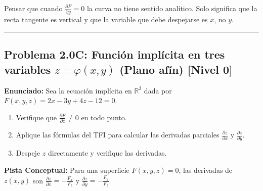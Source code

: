 \documentclass[11pt,a4paper]{article}
\begin{document}
\begin{trapbox}
Pensar que cuando $\frac{\partial F}{\partial y} = 0$ la curva no tiene sentido analítico. Solo significa que la recta tangente es vertical y que la variable que debe despejarse es $x$, no $y$.
\end{trapbox}

\vspace{0.5cm}
\hrule
\vspace{0.5cm}
\subsection*{Problema 2.0C: Función implícita en tres variables $z = \varphi(x,y)$ (Plano afín) \hfill \color{teal}\small[Nivel 0]}

\begin{tcolorbox}[colback=white,colframe=gray!40,arc=1mm,boxrule=0.5pt,left=3mm,right=3mm,top=2mm,bottom=2mm]
\textbf{Enunciado:} Sea la ecuación implícita en $\mathbb{R}^3$ dada por $F(x,y,z) = 2x - 3y + 4z - 12 = 0$.
\begin{enumerate}[label=\textbf{\alph*)}]
\item Verifique que $\frac{\partial F}{\partial z} \neq 0$ en todo punto.
\item Aplique las fórmulas del TFI para calcular las derivadas parciales $\frac{\partial z}{\partial x}$ y $\frac{\partial z}{\partial y}$.
\item Despeje $z$ directamente y verifique las derivadas.
\end{enumerate}
\end{tcolorbox}

\begin{tcolorbox}[colback=yellow!4,colframe=accentamber!70,arc=1mm,boxrule=0.5pt,left=3mm,right=3mm,top=1.5mm,bottom=1.5mm]
\textbf{Pista Conceptual:} Para una superficie $F(x,y,z)=0$, las derivadas de $z(x,y)$ son $\frac{\partial z}{\partial x} = -\frac{F_x}{F_z}$ y $\frac{\partial z}{\partial y} = -\frac{F_y}{F_z}$.
\end{tcolorbox}
\end{document}
